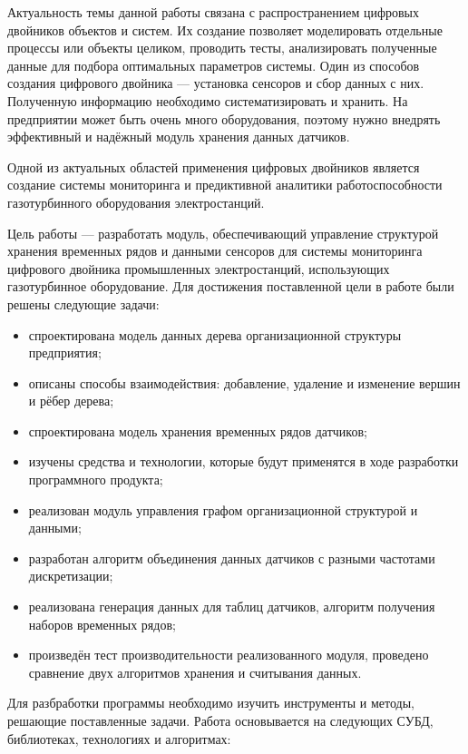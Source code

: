 \introduction %

Актуальность темы данной работы связана с распространением цифровых двойников объектов и систем. Их создание позволяет моделировать отдельные процессы или объекты целиком, проводить тесты, анализировать полученные данные для подбора оптимальных параметров системы. Один из способов создания цифрового двойника --- установка сенсоров и сбор данных с них. Полученную информацию необходимо систематизировать и хранить. На предприятии может быть очень много оборудования, поэтому нужно внедрять эффективный и надёжный модуль хранения данных датчиков.

Одной из актуальных областей применения цифровых двойников является создание системы мониторинга и предиктивной аналитики работоспособности газотурбинного оборудования электростанций.

Цель работы --- разработать модуль, обеспечивающий управление структурой хранения временных рядов и данными сенсоров для системы мониторинга цифрового двойника промышленных электростанций, использующих газотурбинное оборудование. Для достижения поставленной цели в работе были решены следующие задачи:

\begin{itemize}
    \item спроектирована модель данных дерева организационной структуры предприятия;
    \item описаны способы взаимодействия: добавление, удаление и изменение вершин и рёбер дерева;
    \item спроектирована модель хранения временных рядов датчиков;
    \item изучены средства и технологии, которые будут применятся в ходе разработки программного продукта;
    \item реализован модуль управления графом организационной структурой и данными;
    \item разработан алгоритм объединения данных датчиков с разными частотами дискретизации;
    \item реализована генерация данных для таблиц датчиков, алгоритм получения наборов временных рядов;
    \item произведён тест производительности реализованного модуля, проведено сравнение двух алгоритмов хранения и считывания данных.
\end{itemize}

Для разбработки программы необходимо изучить инструменты и методы, решающие поставленные задачи. Работа основывается на следующих СУБД, библиотеках, технологиях и алгоритмах:

